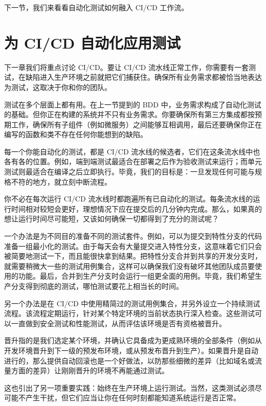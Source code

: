 下一节，我们来看看自动化测试如何融入 CI/CD 工作流。

\section{为 CI/CD 自动化应用测试}

\label{idx:876}
下一章我们将重点讨论 CI/CD。要让 CI/CD 流水线正常工作，你需要有一套测试，在缺陷进入生产环境之前就把它们捕获住。确保所有业务需求都被恰当地表达为测试，这取决于你和你的团队。

\label{idx:877}
测试在多个层面上都有用。在上一节提到的 BDD 中，业务需求构成了自动化测试的基础。但你正在构建的系统并不只有业务需求。你要确保所有第三方集成都按预期工作，确保所有子组件（例如微服务）之间能够互相调用，最后还要确保你正在编写的函数和类不存在任何你能想到的缺陷。

每一个你能自动化的测试，都是 CI/CD 流水线的候选者，它们在这条流水线中也各有各的位置。例如，端到端测试最适合在部署之后作为验收测试来运行；而单元测试则最适合在编译之后立即执行。毕竟，我们的目标是：一旦发现任何可能与规格不符的地方，就立刻中断流程。

你不必在每次运行 CI/CD 流水线时都跑遍所有已自动化的测试。每条流水线的运行时间相对较短会更好，理想情况下应在提交后的几分钟内完成。那么，如果真的想让运行时间尽可能短，又该如何确保一切都得到了充分的测试呢？

一个办法是为不同目的准备不同的测试套件。例如，可以为提交到特性分支的代码准备一组最小化的测试。由于每天会有大量提交进入特性分支，这意味着它们只会被简要地测试一下，而且能很快拿到结果。把特性分支合并到共享的开发分支时，就需要稍微大一些的测试用例集合，这样可以确保我们没有破坏其他团队成员要使用的功能。最后，合并到生产分支时会运行一组更全面的用例。毕竟，我们希望生产分支得到彻底的测试，哪怕测试要花上相当长的时间。

另一个办法是在 CI/CD 中使用精简过的测试用例集合，并另外设立一个持续测试流程。该流程定期运行，针对某个特定环境的当前状态执行深入检查。这些测试可以一直做到安全测试和性能测试，从而评估该环境是否有资格被晋升。

\label{idx:878}
\label{idx:879}
晋升指的是我们选定某个环境，并确认它具备成为更成熟环境的全部条件（例如从开发环境晋升到下一级的预发布环境，或从预发布晋升到生产）。如果晋升是自动进行的，那么提供自动回滚也是一个好做法，以防那些细微的差异（比如域名或流量方面的差异）让刚刚晋升的环境不再能通过测试。

这也引出了另一项重要实践：始终在生产环境上运行测试。当然，这类测试必须尽可能不产生干扰，但它们应当让你在任何时刻都能知道系统运行是否正常。

